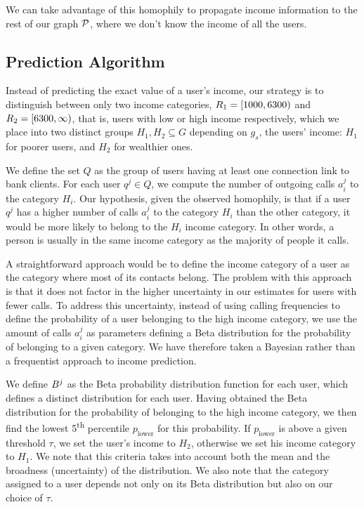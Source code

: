 We can take advantage of this homophily to propagate income information to the rest of our graph $\mathcal{P}$, where we don't know the income of all the users.

\subsection{Prediction Algorithm}

Instead of predicting the exact value of a user's income, our strategy is to distinguish between only two income categories, $R_1 = \left[ 1000, 6300 \right)$ and $R_2 = \left[ 6300, \infty \right)$, that is, users with low or high income respectively, which we place into two distinct groups $H_1, H_2 \subseteq G$ depending on $g_s$, the users' income: $H_1$ for poorer users, and $H_2$ for wealthier ones.

We define the set $Q$ as the group of users having at least one connection link to bank clients. For each user $q^j \in Q$, we compute the number of outgoing calls $a^j_i$ to the category $H_i$. Our hypothesis, given the observed homophily, is that if a user $q^j$ has a higher number of calls $a^j_i$ to the category $H_i$ than the other category, it would be more likely to belong to the $H_i$ income category. In other words, a person is usually in the same income category as the majority of people it calls.

A straightforward approach would be to define the income category of a user as the category where most of its contacts belong. The problem with this approach is that it does not factor in the higher uncertainty in our estimates for users with fewer calls. To address this uncertainty, instead of using calling frequencies to define the probability of a user belonging to the high income category, we use the amount of calls $a^j_i$ as parameters defining a Beta distribution for the probability of belonging to a given category. We have therefore taken a Bayesian rather than a frequentist approach to income prediction.

We define $B^j$ as the Beta probability distribution function for each user, which defines a distinct distribution for each user. Having obtained the Beta distribution for the probability of belonging to the high income category, we then find the lowest 5\textsuperscript{th} percentile $p_{\operatorname{lower}}$ for this probability. If $p_{\operatorname{lower}}$ is above a given threshold $\tau$, we set the user's income to $H_2$, otherwise we set his income category to $H_1$. We note that this criteria takes into account both the mean and the broadness (uncertainty) of the distribution. We also note that the category assigned to a user depends not only on its Beta distribution but also on our choice of $\tau$.

